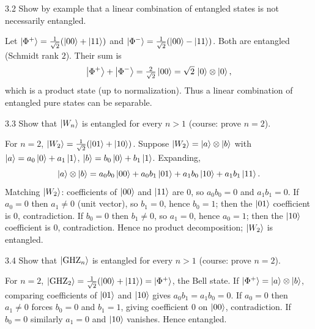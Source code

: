 \begin{exercise}{3.2}
Show by example that a linear combination of entangled states is not necessarily entangled.
\end{exercise}
\begin{solution}
Let $\left|\Phi^+\right\rangle=\tfrac{1}{\sqrt{2}}(\left|00\right\rangle+\left|11\right\rangle)$ and $\left|\Phi^-\right\rangle=\tfrac{1}{\sqrt{2}}(\left|00\right\rangle-\left|11\right\rangle)$. Both are entangled (Schmidt rank $2$). Their sum is
\[
\left|\Phi^+\right\rangle+\left|\Phi^-\right\rangle=\tfrac{2}{\sqrt{2}}\left|00\right\rangle=\sqrt{2}\,\left|0\right\rangle\otimes\left|0\right\rangle,
\]
which is a product state (up to normalization). Thus a linear combination of entangled pure states can be separable.
\end{solution}

\begin{exercise}{3.3}
Show that $\left|W_n\right\rangle$ is entangled for every $n>1$ (course: prove $n=2$).
\end{exercise}
\begin{solution}
For $n=2$, $\left|W_2\right\rangle=\tfrac{1}{\sqrt{2}}(\left|01\right\rangle+\left|10\right\rangle)$. Suppose $\left|W_2\right\rangle=\left|a\right\rangle\otimes\left|b\right\rangle$ with $\left|a\right\rangle=a_0\left|0\right\rangle+a_1\left|1\right\rangle$, $\left|b\right\rangle=b_0\left|0\right\rangle+b_1\left|1\right\rangle$. Expanding,
\[
\left|a\right\rangle\otimes\left|b\right\rangle=a_0b_0\left|00\right\rangle+a_0b_1\left|01\right\rangle+a_1b_0\left|10\right\rangle+a_1b_1\left|11\right\rangle.
\]
Matching $\left|W_2\right\rangle$: coefficients of $\left|00\right\rangle$ and $\left|11\right\rangle$ are $0$, so $a_0b_0=0$ and $a_1b_1=0$. If $a_0=0$ then $a_1\neq 0$ (unit vector), so $b_1=0$, hence $b_0=1$; then the $\left|01\right\rangle$ coefficient is $0$, contradiction. If $b_0=0$ then $b_1\neq 0$, so $a_1=0$, hence $a_0=1$; then the $\left|10\right\rangle$ coefficient is $0$, contradiction. Hence no product decomposition; $\left|W_2\right\rangle$ is entangled.
\end{solution}

\begin{exercise}{3.4}
Show that $\left|\mathrm{GHZ}_n\right\rangle$ is entangled for every $n>1$ (course: prove $n=2$).
\end{exercise}
\begin{solution}
For $n=2$, $\left|\mathrm{GHZ}_2\right\rangle=\tfrac{1}{\sqrt{2}}(\left|00\right\rangle+\left|11\right\rangle)=\left|\Phi^+\right\rangle$, the Bell state. If $\left|\Phi^+\right\rangle=\left|a\right\rangle\otimes\left|b\right\rangle$, comparing coefficients of $\left|01\right\rangle$ and $\left|10\right\rangle$ gives $a_0b_1=a_1b_0=0$. If $a_0=0$ then $a_1\neq 0$ forces $b_0=0$ and $b_1=1$, giving coefficient $0$ on $\left|00\right\rangle$, contradiction. If $b_0=0$ similarly $a_1=0$ and $\left|10\right\rangle$ vanishes. Hence entangled.
\end{solution}


